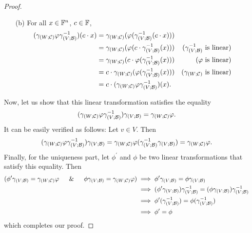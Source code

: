 \begin{proof}
\begin{itemize}
        \item[(b)] For all $x \in \mathbb{F}^{n}$, $c \in \mathbb{F}$,
        \begin{align*}
            (\gamma_{(W; \mathcal{C})} \varphi \gamma_{(V; \mathcal{B})}^{-1})(c \cdot x) &= \gamma_{(W; \mathcal{C})}(\varphi(\gamma_{(V; \mathcal{B})}^{-1}(c \cdot x))) \\
                                                                              &= \gamma_{(W; \mathcal{C})}(\varphi(c \cdot \gamma_{(V; \mathcal{B})}^{-1}(x)))             &\text{($\gamma_{(V; \mathcal{B})}^{-1}$ is linear)} \\
                                                                              &= \gamma_{(W; \mathcal{C})}(c \cdot \varphi(\gamma_{(V; \mathcal{B})}^{-1}(x)))             &\text{($\varphi$ is linear)} \\
                                                                              &= c \cdot \gamma_{(W; \mathcal{C})}(\varphi(\gamma_{(V; \mathcal{B})}^{-1}(x)))             &\text{($\gamma_{(W; \mathcal{C})}$ is linear)} \\
                                                                              &= c \cdot (\gamma_{(W; \mathcal{C})} \varphi \gamma_{(V; \mathcal{B})}^{-1})(x).
        \end{align*}
    \end{itemize}
    Now, let us show that this linear transformation satisfies the equality
    \[
        (\gamma_{(W; \mathcal{C})} \varphi \gamma_{(V; \mathcal{B})}^{-1}) \gamma_{(V; \mathcal{B})} = \gamma_{(W; \mathcal{C})} \varphi.
    \]
    It can be easily verified as follows: Let $v \in V$. Then
    \[
        (\gamma_{(W; \mathcal{C})} \varphi \gamma_{(V; \mathcal{B})}^{-1}) \gamma_{(V; \mathcal{B})} = \gamma_{(W; \mathcal{C})} \varphi (\gamma_{(V; \mathcal{B})}^{-1} \gamma_{(V; \mathcal{B})})
                                                                                        = \gamma_{(W; \mathcal{C})} \varphi.
    \]
    Finally, for the uniqueness part, let $\phi^{\prime}$ and $\phi$ be two
    linear transformations that satisfy this equality. Then
    \begin{align*}
        (\comptwo{\phi^{\prime}}{\comap{V}{\B}} = \comptwo{\comap{W}{\C}}{\varphi}
        \quad \And \quad
        \comptwo{\phi}{\comap{V}{\B}} = \comptwo{\comap{W}{\C}}{\varphi})
        &\implies \comptwo{\phi^{\prime}}{\comap{V}{\B}} = \comptwo{\phi}{\comap{V}{\B}} \\
        &\implies \comptwo{(\comptwo{\phi^{\prime}}{\comap{V}{\B}})}{\comap{V}{\B}^{-1}} = \comptwo{(\comptwo{\phi}{\comap{V}{\B}})}{\comap{V}{\B}^{-1}} \\
        &\implies \comptwo{\phi^{\prime}}{(\comap{V}{\B}^{-1})} = \comptwo{\phi}{(\comap{V}{\B}^{-1})} \\
        &\implies \phi^{\prime} = \phi
    \end{align*}
    which completes our proof.
\end{proof}

